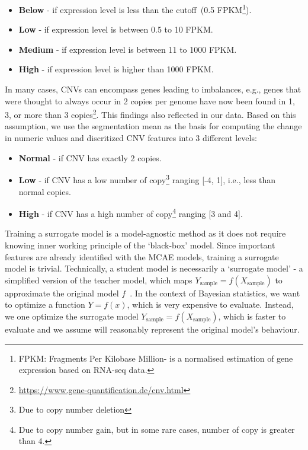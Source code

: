 \vspace{-2mm}
\begin{itemize}[noitemsep]
    \item \textbf{Below} - if expression level is less than the cutoff~(0.5 FPKM\footnote{FPKM: Fragments Per Kilobase Million- is a normalised estimation of gene expression based on RNA-seq data.}).
    \item \textbf{Low} - if expression level is between 0.5 to 10 FPKM.
    \item \textbf{Medium} - if expression level is between 11 to 1000 FPKM. 
    \item \textbf{High} - if expression level is higher than 1000 FPKM. 
\end{itemize}

\hspace*{3.5mm} In many cases, CNVs can encompass genes leading to imbalances, e.g., genes that were thought to always occur in 2 copies per genome have now been found in 1, 3, or more than 3  copies\footnote{\url{https://www.gene-quantification.de/cnv.html}}. This findings also reflected in our data. Based on this assumption, we use the segmentation mean as the basis for computing the change in numeric values and discritized CNV features into 3 different levels:  

\vspace{-2mm}
\begin{itemize}[noitemsep]
    \item \textbf{Normal} - if CNV has exactly 2 copies.
    \item\textbf{Low} - if CNV has a low number of copy\footnote{Due to copy number deletion} ranging [-4, 1], i.e., less than normal copies.
    \item\textbf{High} - if CNV has a high number of copy\footnote{Due to copy number gain, but in some rare cases, number of copy is greater than 4.} ranging [3 and 4].  %
\end{itemize}
\vspace{-2mm}

\hspace*{3.5mm} Training a surrogate model is a model-agnostic method as it does not require knowing inner working principle of the `black-box' model. Since important features are already identified with the MCAE models, training a surrogate model is trivial. Technically, a student model is necessarily a `surrogate model' - a simplified version of the teacher model, which maps $Y_\text{sample}=f(X_\text{sample})$ to approximate the original model $f$~\cite{forrester2008engineering}. In the context of Bayesian statistics, we want to optimize a function $Y=f(x)$, which is very expensive to evaluate. Instead, we one optimize the surrogate model $Y_\text{sample}=f(X_\text{sample})$, which is faster to evaluate and we assume will reasonably represent the original model's behaviour. 

